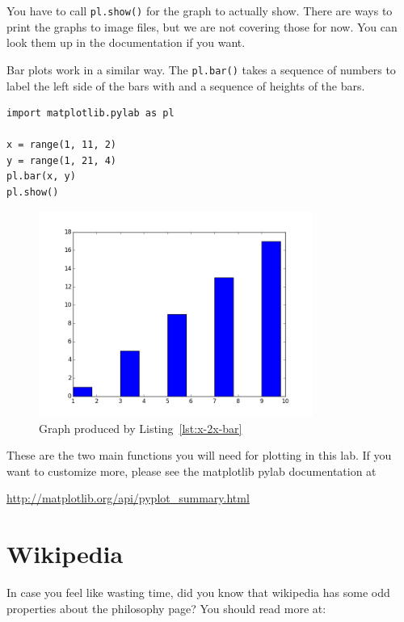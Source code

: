 \documentclass[11pt]{cselabheader}
\begin{document}
You have to call \lstinline!pl.show()! for the graph to actually show. There are
ways to print the graphs to image files, but we are not covering those for now.
You can look them up in the documentation if you want.

Bar plots work in a similar way. The \lstinline!pl.bar()! takes a sequence of
numbers to label the left side of the bars with and a sequence of heights of the
bars.

\begin{lstlisting}[caption={Code to produce Figure~\ref{fig:x-2x-bar}},label={lst:x-2x-bar}]
import matplotlib.pylab as pl

x = range(1, 11, 2)
y = range(1, 21, 4)
pl.bar(x, y)
pl.show()
\end{lstlisting}

\begin{figure}[!ht]
  \centering
  \includegraphics[width=0.8\textwidth]{lab11/x-2x-bar-plot.png}
  \caption{Graph produced by Listing~\ref{lst:x-2x-bar}}
  \label{fig:x-2x-bar}
\end{figure}

These are the two main functions you will need for plotting in this lab. If you
want to customize more, please see the matplotlib pylab documentation at
\begin{center}
  \url{http://matplotlib.org/api/pyplot_summary.html}
\end{center}

\pagebreak
\section{Wikipedia}

In case you feel like wasting time, did you know that wikipedia has some odd
properties about the philosophy page? You should read more at:
\end{document}
